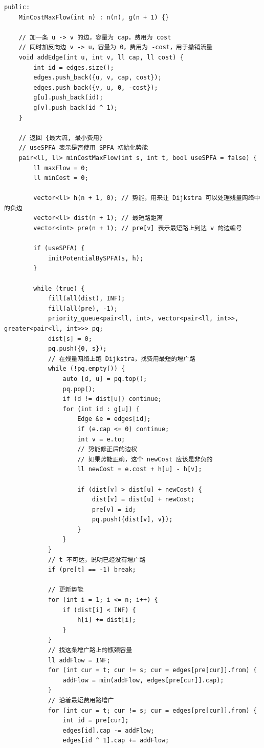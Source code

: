 \documentclass[10pt]{article}
\begin{document}
\begin{multicols*}{2}
\begin{verbatim}
public:
    MinCostMaxFlow(int n) : n(n), g(n + 1) {}

    // 加一条 u -> v 的边，容量为 cap，费用为 cost
    // 同时加反向边 v -> u，容量为 0，费用为 -cost，用于撤销流量
    void addEdge(int u, int v, ll cap, ll cost) {
        int id = edges.size();
        edges.push_back({u, v, cap, cost});
        edges.push_back({v, u, 0, -cost});
        g[u].push_back(id);
        g[v].push_back(id ^ 1);
    }

    // 返回 {最大流, 最小费用}
    // useSPFA 表示是否使用 SPFA 初始化势能
    pair<ll, ll> minCostMaxFlow(int s, int t, bool useSPFA = false) {
        ll maxFlow = 0;
        ll minCost = 0;

        vector<ll> h(n + 1, 0); // 势能，用来让 Dijkstra 可以处理残量网络中的负边
        vector<ll> dist(n + 1); // 最短路距离
        vector<int> pre(n + 1); // pre[v] 表示最短路上到达 v 的边编号

        if (useSPFA) {
            initPotentialBySPFA(s, h);
        }

        while (true) {
            fill(all(dist), INF);
            fill(all(pre), -1);
            priority_queue<pair<ll, int>, vector<pair<ll, int>>, greater<pair<ll, int>>> pq;
            dist[s] = 0;
            pq.push({0, s});
            // 在残量网络上跑 Dijkstra，找费用最短的增广路
            while (!pq.empty()) {
                auto [d, u] = pq.top();
                pq.pop();
                if (d != dist[u]) continue;
                for (int id : g[u]) {
                    Edge &e = edges[id];
                    if (e.cap <= 0) continue;
                    int v = e.to;
                    // 势能修正后的边权
                    // 如果势能正确，这个 newCost 应该是非负的
                    ll newCost = e.cost + h[u] - h[v];

                    if (dist[v] > dist[u] + newCost) {
                        dist[v] = dist[u] + newCost;
                        pre[v] = id;
                        pq.push({dist[v], v});
                    }
                }
            }
            // t 不可达，说明已经没有增广路
            if (pre[t] == -1) break;

            // 更新势能
            for (int i = 1; i <= n; i++) {
                if (dist[i] < INF) {
                    h[i] += dist[i];
                }
            }
            // 找这条增广路上的瓶颈容量
            ll addFlow = INF;
            for (int cur = t; cur != s; cur = edges[pre[cur]].from) {
                addFlow = min(addFlow, edges[pre[cur]].cap);
            }
            // 沿着最短费用路增广
            for (int cur = t; cur != s; cur = edges[pre[cur]].from) {
                int id = pre[cur];
                edges[id].cap -= addFlow;
                edges[id ^ 1].cap += addFlow;


\end{verbatim}
\end{multicols*}
\end{document}
